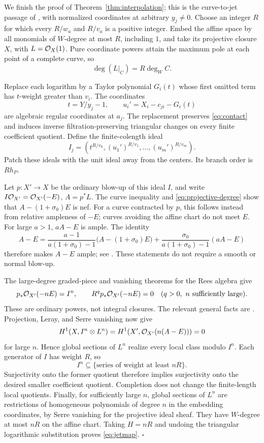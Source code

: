 We finish the proof of Theorem~\ref{thm:interpolation}; this is the
curve-to-jet passage of \cite[Section 2.3]{OAIpi}, with normalized
coordinates at arbitrary \(y_j\ne0\).
Choose an integer \(R\) for which every \(R/w_a\) and \(R/v_a\)
is a positive integer. Embed the affine space by all monomials of
\(W\)-degree at most \(R\), including \(1\), and take its projective
closure \(X\), with \(L=\mathcal O_X(1)\).
Pure coordinate powers attain the maximum pole at each point of a
complete curve, so
\begin{equation}\label{eq:projective-degree}
 \deg(L|_C)=R\deg_W C.
\end{equation}

Replace each logarithm by a Taylor polynomial \(G_i(t)\) whose first
omitted term has \(t\)-weight greater than \(v_i\). The coordinates
\[
 t=Y/y_j-1,\qquad u_i'=X_i-c_{ji}-G_i(t)
\]
are algebraic regular coordinates at \(a_j\).
The replacement preserves \eqref{eq:contact} and induces inverse
filtration-preserving triangular changes on every finite coefficient
quotient. Define the finite-colength ideal
\[
 I_j=(t^{R/v_0},(u_1')^{R/v_1},\ldots,(u_m')^{R/v_m}).
\]
Patch these ideals with the unit ideal away from the centers.
Its branch order is \(Rh_P\).

Let \(p:X'\to X\) be the ordinary blow-up of this ideal \(I\), and
write \(I\mathcal O_{X'}=\mathcal O_{X'}(-E)\), \(A=p^*L\).
The curve inequality and \eqref{eq:projective-degree} show that
\(A-(1+\sigma_0)E\) is nef.
For a curve contracted by \(p\), this follows instead from relative
ampleness of \(-E\); curves avoiding the affine chart do not meet \(E\).
For large \(a>1\), \(aA-E\) is ample.
The identity
\[
 A-E=
 \frac{a-1}{a(1+\sigma_0)-1}\bigl(A-(1+\sigma_0)E\bigr)
 +\frac{\sigma_0}{a(1+\sigma_0)-1}(aA-E)
\]
therefore makes \(A-E\) ample; see
\cite[Corollary 1.4.10]{Lazarsfeld2004}.
These statements do not require a smooth or normal blow-up.

The large-degree graded-piece and vanishing theorems for the Rees
algebra give
\[
 p_*\mathcal O_{X'}(-nE)=I^n,\qquad
 R^q p_*\mathcal O_{X'}(-nE)=0\quad(q>0,\ n\text{ sufficiently large}).
\]
These are ordinary powers, not integral closures.
The relevant general facts are \cite[Tags 0AG6 and 0AG7]{Stacks}.
Projection, Leray, and Serre vanishing now give
\[
 H^1(X,I^n\otimes L^n)=
 H^1(X',\mathcal O_{X'}(n(A-E)))=0
\]
for large \(n\).
Hence global sections of \(L^n\) realize every local class modulo
\(I^n\). Each generator of \(I\) has weight \(R\), so
\[
 I^n\subseteq\{\text{series of weight at least }nR\}.
\]
Surjectivity onto the former quotient therefore implies surjectivity
onto the desired smaller coefficient quotient.
Completion does not change the finite-length local quotients.
Finally, for sufficiently large \(n\), global sections of \(L^n\)
are restrictions of homogeneous polynomials of degree \(n\) in the
embedding coordinates, by Serre vanishing for the projective ideal
sheaf. They have \(W\)-degree at most \(nR\) on the affine chart.
Taking \(H=nR\) and undoing the triangular logarithmic substitution
proves \eqref{eq:jetmap}.
\hfill\(\square\)
